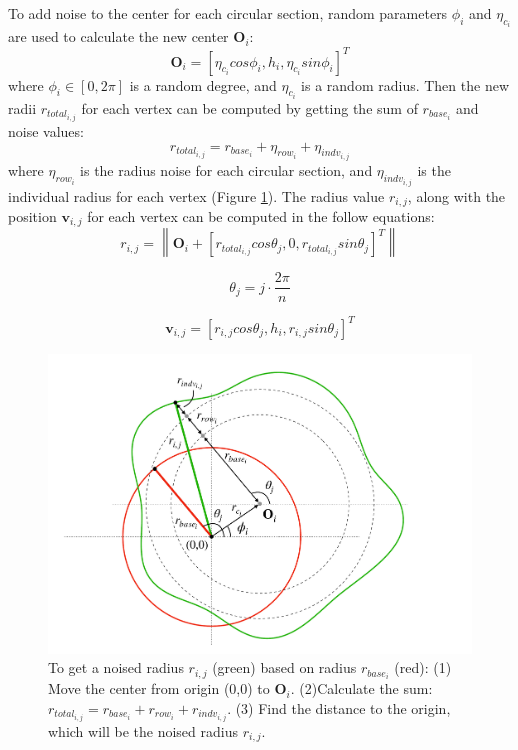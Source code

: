 \documentclass{svjour3}                     %
\begin{document}
To add noise to the center for each circular section, random parameters $\phi_{i}$ and $\eta_{c_{i}}$ are used to calculate the new center $\mathbf{O}_{i}$:
\begin{equation}
\label{eqn:oi}
\mathbf{O}_{i} = \left[\eta_{c_{i}}cos\phi_{i}, h_{i}, \eta_{c_{i}}sin\phi_{i}\right]^T
\end{equation}
where $\phi_{i} \in [0, 2\pi]$ is a random degree, and $\eta_{c_{i}}$ is a random radius.
Then the new radii $r_{total_{i,j}}$ for each vertex can be computed by getting the sum of $r_{base_{i}}$ and noise values:
\begin{equation}
r_{total_{i,j}} = r_{base_{i}} + \eta_{row_{i}} + \eta_{indv_{i,j}}
\end{equation}
where $\eta_{row_{i}}$ is the radius noise for each circular section, and $\eta_{indv_{i,j}}$ is the individual radius for each vertex (Figure \ref{fig:noise}). The radius value $r_{i,j}$, along with the position $\mathbf{v}_{i,j}$ for each vertex can be computed in the follow equations:
\begin{equation}
r_{i,j} = \left\|
\mathbf{O}_{i} + \left[ r_{total_{i,j}} cos \theta_{j},
0,
r_{total_{i,j}} sin \theta_{j}
\right]^T
\right\| 
\end{equation}

\begin{equation}
\theta_{j} = j \cdot \frac{2\pi}{n}
\end{equation}

\begin{equation}
\label{eqn:v}
\mathbf{v}_{i,j} =
\left[r_{i,j}  cos \theta_{j},
h_{i},
r_{i,j} sin \theta_{j}\right]^T
\end{equation}

\begin{figure}
\includegraphics[width=\textwidth]{fig5.pdf}
\caption{To get a noised radius $r_{i,j}$ (green) based on radius $r_{base_{i}}$ (red): (1) Move the center from origin (0,0) to $\mathbf{O}_{i}$. (2)Calculate the sum: $r_{total_{i,j}} = r_{base_{i}} + r_{row_{i}} + r_{indv_{i,j}}$. (3) Find the distance to the origin, which will be the noised radius $r_{i,j}$.}
\label{fig:noise}
\end{figure}
\end{document}
